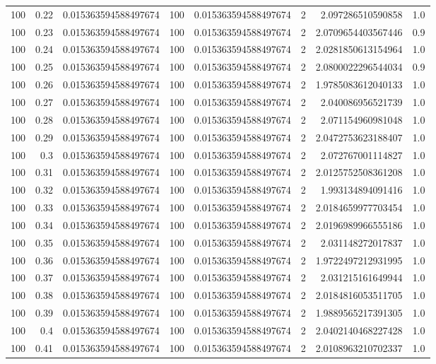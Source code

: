 \documentclass[11pt]{article}
\begin{document}
\begin{center}
\begin{tabular}{rrrrrrrr}
100 & 0.22 & 0.015363594588497674 & 100 & 0.015363594588497674 & 2 & 2.097286510590858 & 1.0\\
100 & 0.23 & 0.015363594588497674 & 100 & 0.015363594588497674 & 2 & 2.0709654403567446 & 0.9\\
100 & 0.24 & 0.015363594588497674 & 100 & 0.015363594588497674 & 2 & 2.0281850613154964 & 1.0\\
100 & 0.25 & 0.015363594588497674 & 100 & 0.015363594588497674 & 2 & 2.0800022296544034 & 0.9\\
100 & 0.26 & 0.015363594588497674 & 100 & 0.015363594588497674 & 2 & 1.9785083612040133 & 1.0\\
100 & 0.27 & 0.015363594588497674 & 100 & 0.015363594588497674 & 2 & 2.040086956521739 & 1.0\\
100 & 0.28 & 0.015363594588497674 & 100 & 0.015363594588497674 & 2 & 2.071154960981048 & 1.0\\
100 & 0.29 & 0.015363594588497674 & 100 & 0.015363594588497674 & 2 & 2.0472753623188407 & 1.0\\
100 & 0.3 & 0.015363594588497674 & 100 & 0.015363594588497674 & 2 & 2.072767001114827 & 1.0\\
100 & 0.31 & 0.015363594588497674 & 100 & 0.015363594588497674 & 2 & 2.0125752508361208 & 1.0\\
100 & 0.32 & 0.015363594588497674 & 100 & 0.015363594588497674 & 2 & 1.993134894091416 & 1.0\\
100 & 0.33 & 0.015363594588497674 & 100 & 0.015363594588497674 & 2 & 2.0184659977703454 & 1.0\\
100 & 0.34 & 0.015363594588497674 & 100 & 0.015363594588497674 & 2 & 2.0196989966555186 & 1.0\\
100 & 0.35 & 0.015363594588497674 & 100 & 0.015363594588497674 & 2 & 2.031148272017837 & 1.0\\
100 & 0.36 & 0.015363594588497674 & 100 & 0.015363594588497674 & 2 & 1.9722497212931995 & 1.0\\
100 & 0.37 & 0.015363594588497674 & 100 & 0.015363594588497674 & 2 & 2.031215161649944 & 1.0\\
100 & 0.38 & 0.015363594588497674 & 100 & 0.015363594588497674 & 2 & 2.0184816053511705 & 1.0\\
100 & 0.39 & 0.015363594588497674 & 100 & 0.015363594588497674 & 2 & 1.9889565217391305 & 1.0\\
100 & 0.4 & 0.015363594588497674 & 100 & 0.015363594588497674 & 2 & 2.0402140468227428 & 1.0\\
100 & 0.41 & 0.015363594588497674 & 100 & 0.015363594588497674 & 2 & 2.0108963210702337 & 1.0\\

\end{tabular}
\end{center}
\end{document}
